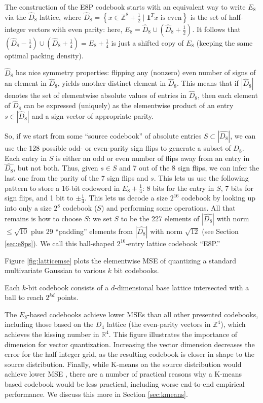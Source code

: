 The construction of the E8P codebook starts with an equivalent way to write $E_8$ via the $\hat D_8$ lattice, where $\hat D_8 = \left\{ x \in \mathbb{Z}^8 + \frac{1}{2} \mid \mathbf{1}^T x \text{ is even} \right\}$ is the set of half-integer vectors with even parity: here, $E_8 = \hat D_8 \cup (\hat D_8 + \frac{1}{2})$. It follows that $(\hat D_8 - \frac{1}{4}) \cup (\hat D_8 + \frac{1}{4}) = E_8 + \frac{1}{4}$ is just a shifted copy of $E_8$ (keeping the same optimal packing density).

$\hat D_8$ has nice symmetry properties: flipping any (nonzero) even number of signs of an element in $\hat{D}_8$, yields another distinct element in $\hat{D}_8$. This means that if $|\hat D_8|$ denotes the set of elementwise absolute values of entries in $\hat D_8$, then each element of $\hat D_8$ can be expressed (uniquely) as the elementwise product of an entry $s \in |\hat D_8|$ and a sign vector of appropriate parity.

So, if we start from some ``source codebook'' of absolute entries $S \subset |\hat{D_8}|$, we can use the 128 possible odd- or even-parity sign flips to generate a subset of $\hat{D_8}$.
Each entry in $S$ is either an odd or even number of flips away from an entry in $\hat{D_8}$, but not both. Thus, given $s \in S$ and 7 out of the 8 sign flips, we can infer the last one from the parity of the 7 sign flips and $s$. This lets us use the following pattern to store a 16-bit codeword in $E_8 + \frac{1}{4}$: 8 bits for the entry in $S$, 7 bits for sign flips, and 1 bit to $\pm\frac{1}{4}$.
This lets us decode a size $2^{16}$ codebook by looking up into only a size $2^8$ codebook ($S$) and performing some operations. All that remains is how to choose $S$: we set $S$ to be the 227 elements of $|\hat{D_8}|$ with norm $\le \sqrt{10}$ plus 29 ``padding'' elements from $|\hat{D_8}|$ with norm $\sqrt{12}$ (see Section \ref{sec:e8ps}).
We call this ball-shaped $2^{16}$-entry lattice codebook ``E8P.''

Figure \ref{fig:latticemse} plots the elementwise MSE of quantizing a standard multivariate Gaussian to various $k$ bit codebooks.

Each $k$-bit codebook consists of a $d$-dimensional base lattice intersected with a ball to reach $2^{kd}$ points.

The $E_8$-based codebooks achieve lower MSEs than all other presented codebooks, including those based on the $D_4$ lattice (the even-parity vectors in $\mathbb{Z}^4$), which achieves the kissing number in $\mathbb{R}^4$. 
This figure illustrates the importance of dimension for vector quantization. Increasing the vector dimension decreases the error for the half integer grid, as the resulting codebook is closer in shape to the source distribution. Finally, while K-means on the source distribution would achieve lower MSE \cite{lloyd}, there are a number of practical reasons why a K-means based codebook would be less practical, including worse end-to-end empirical performance. We discuss this more in Section \ref{sec:kmeans}.

